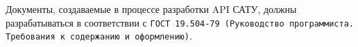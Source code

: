 Документы, создаваемые в процессе разработки API САТУ, должны разрабатываться в соответствии с \texttt{ГОСТ 19.504-79 (Руководство программиста. Требования к содержанию и оформлению)}.